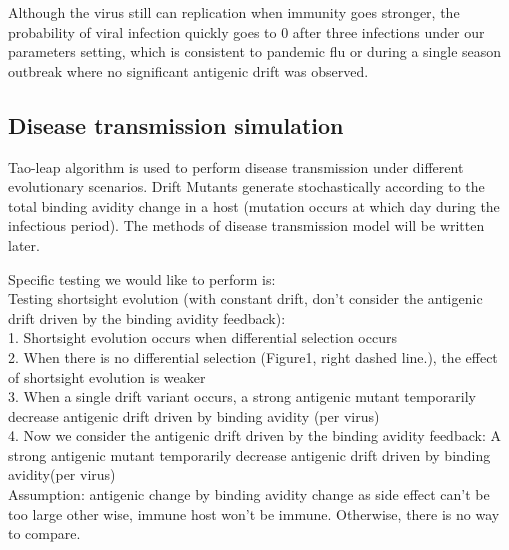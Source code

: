 \documentclass{article}
\begin{document}
Although the virus still can replication when immunity goes stronger, the probability of viral infection quickly goes to 0 after three infections under our parameters setting, which is consistent to pandemic flu or during a single season outbreak where no significant antigenic drift was observed.
 
 
\subsection{Disease transmission simulation}
Tao-leap algorithm is used to perform disease transmission under different evolutionary scenarios. Drift Mutants generate stochastically according to the total binding avidity change in a host (mutation occurs at which day during the infectious period). The methods of disease transmission model will be written later.


Specific testing we would like to perform is: \\
Testing shortsight evolution (with constant drift, don't consider the antigenic drift driven by the binding avidity feedback):\\
1. Shortsight evolution occurs when differential selection occurs \\
2. When there is no differential selection (Figure1, right dashed line.), the effect of shortsight evolution is weaker \\
3. When a single drift variant occurs, a strong antigenic mutant temporarily decrease antigenic drift driven by binding avidity (per virus)  \\
4. Now we consider the antigenic drift driven by the binding avidity feedback: A strong antigenic mutant temporarily decrease antigenic drift driven by binding avidity(per virus)  \\


Assumption: antigenic change by binding avidity change as side effect can't be too large other wise, immune host won't be immune. Otherwise, there is no way to compare. 

                
\end{document}

